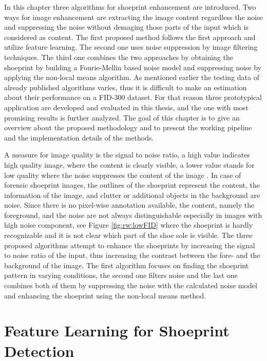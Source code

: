 \documentclass[draft,final]{vutinfth} %
\begin{document}
\par
In this chapter three algorithms for shoeprint enhancement are introduced.
Two ways for image enhancement are extracting the image content regardless the noise and suppressing the noise without demaging those parts of the input which is considered as content.
The first proposed method follows the first approach and utilize feature learning.
The second one uses noise suppression by image filtering techniques.
The third one combines the two approaches by obtaining the shoeprint by building  a Fourie-Mellin based noise model and suppressing noise by applying the non-local means algorithm.
As mentioned earlier the testing data of already published algorithms varies, thus it is difficult to make an estimation about their performance on a FID-300  \cite{kortylewski2014unsupervised} dataset.
For that reason three prototypical application are developed and evaluated in this thesis, and the one with most promising results is further analyzed.
The goal of this chapter is to give an overview about the proposed methodology and to present the working pipeline and the implementation details of the methods.
\par
A measure for image quality is the signal to noise ratio, a high value indicates high quality image, where the content is clearly visible, a lower value stands for low quality where the noise suppresses the content of the image \cite{moubark2016clutter}.
In case of forensic shoeprint images, the outlines of the shoeprint represent the content, the information of the image, and clutter or additional objects in the background are noise. 
Since there is no pixel-wise annotation available, the content, namely the foreground, and the noise are not always distinguishable especially in images with high noise component, see Figure \ref{fig:rw:lowFID} where the shoeprint is hardly recognizable and it is not clear which part of the shoe sole is visible.
The three proposed algorithms attempt to enhance the shoeprints by increasing the signal to noise ratio of the input, thus increasing the contrast between the fore- and the background of the image.
The first algorithm focuses on finding the shoeprint pattern in varying conditions, the second one filters noise and the last one combines both of them by suppressing the noise with the calculated noise model and enhancing the shoeprint using the non-local means method.

\section{Feature Learning for Shoeprint Detection}
\end{document}

